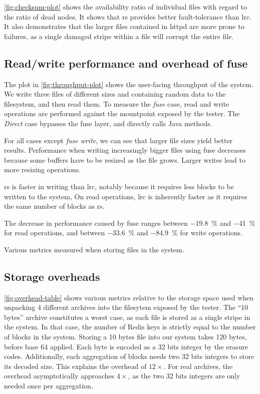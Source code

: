 \autoref{fig:checksum-plot} shows the availability ratio of individual files with regard to the ratio of dead nodes.
It shows that \ac{rs} provides better fault-tolerance than \ac{lrc}.
It also demonstrates that the larger files contained in httpd are more prone to failures, as a single damaged stripe within a file will corrupt the entire file.

\subsection{Read/write performance and overhead of \acs{fuse}}
\label{subsec:rw-perf}

The plot in \autoref{fig:throughput-plot} shows the user-facing throughput of the system.
We write three files of different sizes and containing random data to the filesystem, and then read them.
To measure the \textit{\ac{fuse}} case, read and write operations are performed against the mountpoint exposed by the tester.
The \textit{Direct} case bypasses the \ac{fuse} layer, and directly calls Java methods.

For all cases except \textit{\ac{fuse} write}, we can see that larger file sizes yield better results.
Performance when writing increasingly bigger files using \ac{fuse} decreases because some buffers have to be resized as the file grows.
Larger writes lead to more resizing operations.

\ac{rs} is faster in writing than \ac{lrc}, notably because it requires less blocks to be written to the system,
On read operations, \ac{lrc} is inherently faster as it requires the same number of blocks as \ac{rs}.

The decrease in performance caused by \ac{fuse} ranges between \SI{-19.8}{\percent} and \SI{-41}{\percent} for read operations, and between \SI{-33.6}{\percent} and \SI{-84.9}{\percent} for write operations.

\begin{table*}
    \centering
    \caption{Various metrics measured when storing files in the system.}
    
    \label{fig:overhead-table}
\end{table*}

\subsection{Storage overheads}
\label{subsec:storage-overheads}

\autoref{fig:overhead-table} shows various metrics relative to the storage space used when unpacking 4 different archives into the filesytem exposed by the tester.
The \enquote{10 bytes} archive constitutes a worst case, as each file is stored as a single stripe in the system.
In that case, the number of Redis keys is strictly equal to the number of blocks in the system.
Storing a 10 bytes file into our system takes 120 bytes, before base 64 applied.
Each byte is encoded as a 32 bits integer by the erasure codes.
Additionally, each aggregation of blocks needs two 32 bits integers to store its decoded size.
This explains the overhead of $12\times$.
For real archives, the overhead asymptotically approaches $4\times$, as the two 32 bits integers are only needed once per aggregation.

